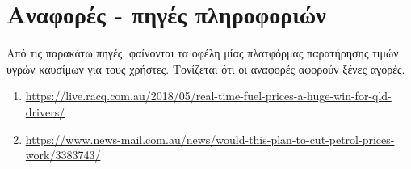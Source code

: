 \section{Αναφορές - πηγές πληροφοριών}

Από τις παρακάτω πηγές, φαίνονται τα οφέλη μίας πλατφόρμας παρατήρησης τιμών υγρών καυσίμων για τους χρήστες. Τονίζεται ότι οι αναφορές αφορούν ξένες αγορές.
\begin{enumerate}
	\item \href{https://live.racq.com.au/2018/05/real-time-fuel-prices-a-huge-win-for-qld-drivers/}{https://live.racq.com.au/2018/05/real-time-fuel-prices-a-huge-win-for-qld-drivers/}
	\item \href{https://www.news-mail.com.au/news/would-this-plan-to-cut-petrol-prices-work/3383743/}{https://www.news-mail.com.au/news/would-this-plan-to-cut-petrol-prices-work/3383743/}
\end{enumerate}